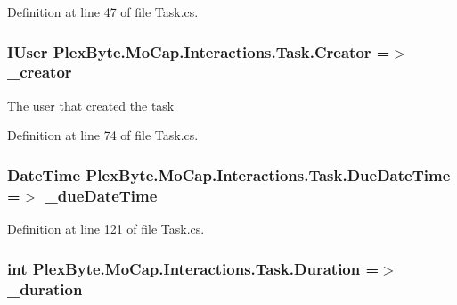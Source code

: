 Definition at line 47 of file Task.\+cs.

\subsubsection[{\texorpdfstring{Creator}{Creator}}]{\setlength{\rightskip}{0pt plus 5cm}I\+User Plex\+Byte.\+Mo\+Cap.\+Interactions.\+Task.\+Creator =$>$ \+\_\+creator}\hypertarget{class_plex_byte_1_1_mo_cap_1_1_interactions_1_1_task_a8fbe07ee1d4f0d20465aa6eb78dd5959}{}\label{class_plex_byte_1_1_mo_cap_1_1_interactions_1_1_task_a8fbe07ee1d4f0d20465aa6eb78dd5959}


The user that created the task 



Definition at line 74 of file Task.\+cs.

\subsubsection[{\texorpdfstring{Due\+Date\+Time}{DueDateTime}}]{\setlength{\rightskip}{0pt plus 5cm}Date\+Time Plex\+Byte.\+Mo\+Cap.\+Interactions.\+Task.\+Due\+Date\+Time =$>$ \+\_\+due\+Date\+Time}\hypertarget{class_plex_byte_1_1_mo_cap_1_1_interactions_1_1_task_ad232b867da717b3f823363d627b24009}{}\label{class_plex_byte_1_1_mo_cap_1_1_interactions_1_1_task_ad232b867da717b3f823363d627b24009}


Definition at line 121 of file Task.\+cs.

\subsubsection[{\texorpdfstring{Duration}{Duration}}]{\setlength{\rightskip}{0pt plus 5cm}int Plex\+Byte.\+Mo\+Cap.\+Interactions.\+Task.\+Duration =$>$ \+\_\+duration}\hypertarget{class_plex_byte_1_1_mo_cap_1_1_interactions_1_1_task_a84a9a89d90c83269366f70ea3e6cc2b9}{}\label{class_plex_byte_1_1_mo_cap_1_1_interactions_1_1_task_a84a9a89d90c83269366f70ea3e6cc2b9}


